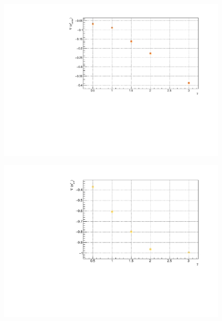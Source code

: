 \begin{figure}[H]
    \centering
    \includegraphics[scale=0.7]{Figures/12sites/12sites_gradLM_centerChainVSgamma.pdf}
    \caption{}
    \label{fig:my_label}
\end{figure}

\begin{figure}[H]
    \centering
    \includegraphics[scale=0.7]{Figures/12sites/12sites_gradLM_3and4VSgamma.pdf}
    \caption{}
    \label{fig:my_label}
\end{figure}

